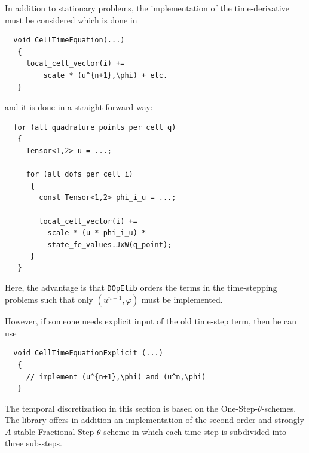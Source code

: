 \documentclass[prodmode,acmtoms]{acmsmall}
\numberwithin{equation}{section}
\renewcommand{\phi}{\varphi}
\newcommand{\dope}{\texttt{DOpElib}}
\begin{document}
In addition to stationary problems, the implementation
of the time-derivative must be considered which is done
in 
\begin{lstlisting}
  void CellTimeEquation(...)
   {
     local_cell_vector(i) += 
         scale * (u^{n+1},\phi) + etc. 
   }
\end{lstlisting}
and it is done in a straight-forward way:
\begin{lstlisting}
  for (all quadrature points per cell q)
   {
     Tensor<1,2> u = ...;

     for (all dofs per cell i)
      {
        const Tensor<1,2> phi_i_u = ...;

        local_cell_vector(i) +=  
          scale * (u * phi_i_u) * 
          state_fe_values.JxW(q_point);
      }
   }
\end{lstlisting}
Here, the advantage is that \dope{} orders the terms in the time-stepping
problems
such that only $(u^{n+1},\phi)$ must be implemented. 



\begin{remark}
However, if someone 
needs explicit input of the old time-step term, then he can use 
\begin{lstlisting}
  void CellTimeEquationExplicit (...)
   {
     // implement (u^{n+1},\phi) and (u^n,\phi)  
   }
\end{lstlisting}
\end{remark}

\begin{remark}
The temporal discretization in this section 
is based on the One-Step-$\theta$-schemes. The library
offers in addition an implementation 
of the second-order and strongly $A$-stable 
Fractional-Step-$\theta$-scheme in which 
each time-step is subdivided into three 
sub-steps. 
\end{remark}
\end{document}
